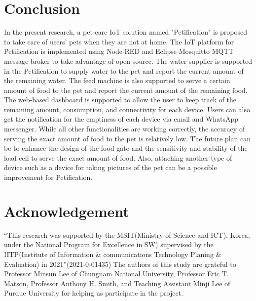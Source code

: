 ﻿\documentclass[conference]{IEEEtran}
\begin{document}
\section{Conclusion}
In the present research, a pet-care IoT solution named "Petification" is proposed to take care of users’ pets when they are not at home.
The IoT platform for Petification is implemented using Node-RED and Eclipse Mosquitto MQTT message broker to take advantage of open-source.
The water supplier is supported in the Petification to supply water to the pet and report the current amount of the remaining water.
The feed machine is also supported to serve a certain amount of food to the pet and report the current amount of the remaining food.
The web-based dashboard is supported to allow the user to keep track of the remaining amount, consumption, and connectivity for each device.
Users can also get the notification for the emptiness of each device via email and WhatsApp messenger.
While all other functionalities are working correctly, the accuracy of serving the exact amount of food to the pet is relatively low.
The future plan can be to enhance the design of the food gate and the sensitivity and stability of the load cell to serve the exact amount of food.
Also, attaching another type of device such as a device for taking pictures of the pet can be a possible improvement for Petification.

\section{Acknowledgement}
“This research was supported by the MSIT(Ministry of Science and ICT), Korea, under the National Program for Excellence in SW) supervised by the IITP(Institute of Information \& communications Technology Planing \& Evaluation) in 2021”(2021-0-01435)
The authors of this study are grateful to Professor Minsun Lee of Chungnam National University, Professor Eric T. Matson, Professor Anthony H. Smith, and Teaching Assistant Minji Lee of Purdue University for helping us participate in the project.
\end{document}
